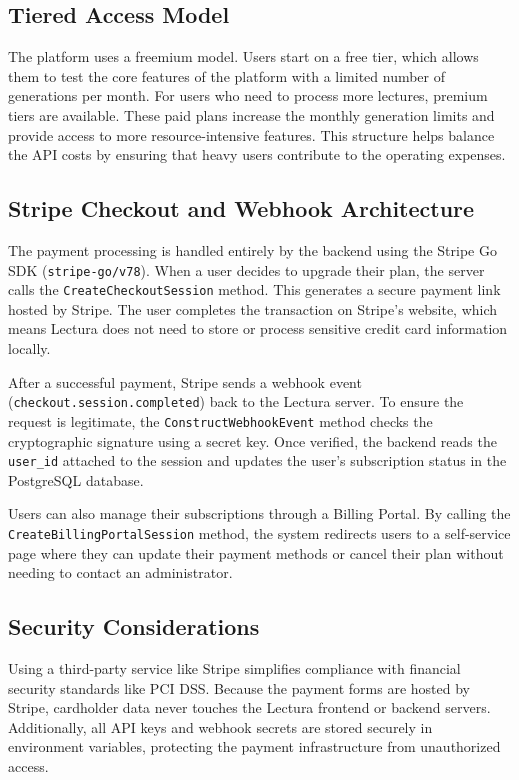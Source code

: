 \subsection{Tiered Access Model}
The platform uses a freemium model. Users start on a free tier, which allows them to test the core features of the platform with a limited number of generations per month. For users who need to process more lectures, premium tiers are available. These paid plans increase the monthly generation limits and provide access to more resource-intensive features. This structure helps balance the API costs by ensuring that heavy users contribute to the operating expenses.

\subsection{Stripe Checkout and Webhook Architecture}
The payment processing is handled entirely by the backend using the Stripe Go SDK (\texttt{stripe-go/v78}). When a user decides to upgrade their plan, the server calls the \texttt{CreateCheckoutSession} method. This generates a secure payment link hosted by Stripe. The user completes the transaction on Stripe's website, which means Lectura does not need to store or process sensitive credit card information locally.

After a successful payment, Stripe sends a webhook event (\texttt{checkout.session.completed}) back to the Lectura server. To ensure the request is legitimate, the \texttt{ConstructWebhookEvent} method checks the cryptographic signature using a secret key. Once verified, the backend reads the \texttt{user\_id} attached to the session and updates the user's subscription status in the PostgreSQL database.

Users can also manage their subscriptions through a Billing Portal. By calling the \texttt{CreateBillingPortalSession} method, the system redirects users to a self-service page where they can update their payment methods or cancel their plan without needing to contact an administrator.

\subsection{Security Considerations}
Using a third-party service like Stripe simplifies compliance with financial security standards like PCI DSS. Because the payment forms are hosted by Stripe, cardholder data never touches the Lectura frontend or backend servers. Additionally, all API keys and webhook secrets are stored securely in environment variables, protecting the payment infrastructure from unauthorized access.